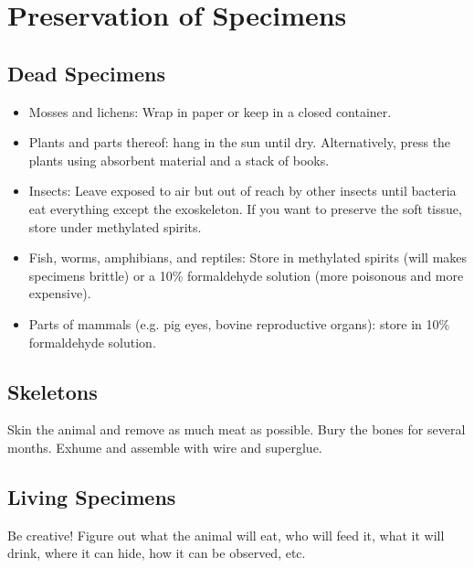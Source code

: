 \chapter{Preservation of Specimens} 

\section{Dead Specimens}
\begin{itemize}

\item{Mosses and lichens: 
Wrap in paper or keep in a closed container.}

\item{Plants and parts thereof: 
hang in the sun until dry. 
Alternatively, press the plants using absorbent material and a stack of books.}

\item{Insects: 
Leave exposed to air but out of reach by other insects 
until bacteria eat everything except the exoskeleton. 
If you want to preserve the soft tissue, 
store under methylated spirits.}

\item{Fish, worms, amphibians, and reptiles: 
Store in methylated spirits (will makes specimens brittle) 
or a 10\% formaldehyde solution (more poisonous and more expensive).}

\item{Parts of mammals (e.g. pig eyes, bovine reproductive organs): 
store in 10\% formaldehyde solution.}

\end{itemize}

\section{Skeletons}
Skin the animal and remove as much meat as possible. 
Bury the bones for several months. 
Exhume and assemble with wire and superglue.

\section{Living Specimens}
Be creative! 
Figure out what the animal will eat, 
who will feed it, what it will drink, where it can hide, 
how it can be observed, etc.
